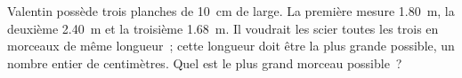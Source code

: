 %
%
Valentin possède trois planches de \SI{10}{cm} de large. La première mesure \SI{1,80}{m}, la deuxième \SI{2,40}{m} et la troisième \SI{1,68}{m}. Il voudrait les scier toutes les trois en morceaux de même longueur~; cette longueur doit être la plus grande possible, un nombre entier de centimètres. Quel est le plus grand morceau possible~?

